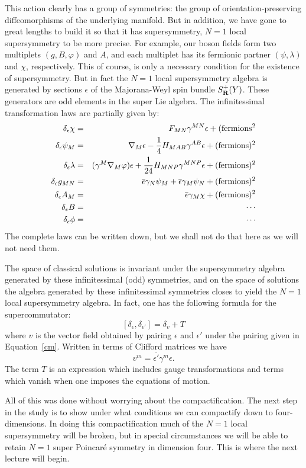 This action clearly has a group of symmetries: the group of
orientation-preserving diffeomorphisms of the underlying manifold. 
But in addition, we have gone to great lengths to build it so that it
has supersymmetry, $N=1$ local supersymmetry to be more precise.  For
example,  our boson fields form two multiplets 
$(g,B,\varphi)$ and $A$, and each multiplet  has its fermionic partner
$(\psi,\lambda)$ and $\chi$,  respectively. 
This of course, is only a necessary condition for the existence of
supersymmetry. But in fact the $N=1$ local supersymmetry algebra is
generated by sections $\epsilon$ of the Majorana-Weyl spin bundle
$S^+_{\bf R}(Y)$. These generators  are odd elements  in the super Lie
algebra. 
The infinitessimal transformation laws are partially given by:
\begin{eqnarray*}
\delta_\epsilon\chi & = & F_{MN}\gamma^{MN}\epsilon+({\rm fermions}^2 \\
\delta_\epsilon\psi_M  &  =  &  \nabla_M\epsilon -\frac{1}{4}
H_{MAB}\gamma^{AB}\epsilon +({\rm fermions})^2 \\
\delta_\epsilon\lambda  &  =  & (\gamma^M \nabla_M\varphi)\epsilon
+\frac{1}{24}H_{MNP}\gamma^{MNP}\epsilon +({\rm fermions})^2 \\
\delta_\epsilon g_{MN}  &  =  &  \overline\epsilon
\gamma_N\psi_M+\overline\epsilon\gamma_M \psi_N+({\rm fermions})^2 \\
\delta_\epsilon A_M  &  =  &  \overline\epsilon \gamma_M\chi +({\rm
fermions})^2 \\
\delta_\epsilon B & = &  \cdots \\
\delta_\epsilon \phi & = & \cdots 
\end{eqnarray*}
The complete laws can be written down, but we shall not do that here
as we will not need them. 

The space of classical solutions is invariant under the supersymmetry
algebra generated by these infinitessimal (odd) symmetries, and on the
space of solutions the algebra generated by these infinitessimal
symmetries closes to yield the $N=1$ local supersymmetry algebra.
In fact, one has the following formula for the supercommutator: 
$$[\delta_\epsilon,\delta_{\epsilon'}]=\delta_v+ T$$
where $v$ is the vector field obtained by pairing $\epsilon$ and
$\epsilon'$ under the pairing given in Equation~\ref{cm}.  Written in
terms of Clifford matrices we have
$$v^m=\overline{\epsilon'}\gamma^m\epsilon.$$
The term  $T$ is an expression which includes gauge transformations
and terms which vanish when one imposes the
equations of motion. 


All of this was done without worrying about the compactification.
The next step in the study is to show under what conditions  we can
compactify down to four-dimensions. In doing this compactification
much of  the $N=1$ local supersymmetry will be broken, but in special
circumstances we will be able to retain $N=1$ super Poincar\'e
symmetry in dimension four.
This is where the next lecture will begin.








